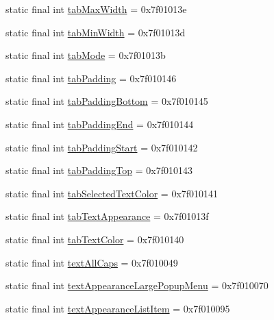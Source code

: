 \begin{CompactItemize}
\item 
static final int \hyperlink{classandroid_1_1support_1_1v7_1_1cardview_1_1_r_1_1attr_62f0af42d2fe75c588e57253235d0551}{tabMaxWidth} = 0x7f01013e
\item 
static final int \hyperlink{classandroid_1_1support_1_1v7_1_1cardview_1_1_r_1_1attr_94555557b32c6757ce9093d84d6eb2c9}{tabMinWidth} = 0x7f01013d
\item 
static final int \hyperlink{classandroid_1_1support_1_1v7_1_1cardview_1_1_r_1_1attr_b55b244d34b62573db40073e19cb5126}{tabMode} = 0x7f01013b
\item 
static final int \hyperlink{classandroid_1_1support_1_1v7_1_1cardview_1_1_r_1_1attr_2e7ad785d084b036d3a2ab86dcac8733}{tabPadding} = 0x7f010146
\item 
static final int \hyperlink{classandroid_1_1support_1_1v7_1_1cardview_1_1_r_1_1attr_1d91fc5b23b7e6327ce3f8cbabbd9699}{tabPaddingBottom} = 0x7f010145
\item 
static final int \hyperlink{classandroid_1_1support_1_1v7_1_1cardview_1_1_r_1_1attr_7ca488e9d7ffd031a7805582f761c4d9}{tabPaddingEnd} = 0x7f010144
\item 
static final int \hyperlink{classandroid_1_1support_1_1v7_1_1cardview_1_1_r_1_1attr_54b83e3a031622ce10b54a318192bcbf}{tabPaddingStart} = 0x7f010142
\item 
static final int \hyperlink{classandroid_1_1support_1_1v7_1_1cardview_1_1_r_1_1attr_21c09bebdf82d16eb1150dfcabd47895}{tabPaddingTop} = 0x7f010143
\item 
static final int \hyperlink{classandroid_1_1support_1_1v7_1_1cardview_1_1_r_1_1attr_a4e8f44a303a59a320f8e72355c7704d}{tabSelectedTextColor} = 0x7f010141
\item 
static final int \hyperlink{classandroid_1_1support_1_1v7_1_1cardview_1_1_r_1_1attr_84a052942353388c579f120da3b4ea0c}{tabTextAppearance} = 0x7f01013f
\item 
static final int \hyperlink{classandroid_1_1support_1_1v7_1_1cardview_1_1_r_1_1attr_1a906a869cf7ac1df0955fe860882e42}{tabTextColor} = 0x7f010140
\item 
static final int \hyperlink{classandroid_1_1support_1_1v7_1_1cardview_1_1_r_1_1attr_3bbc968902d25f099a7cb6590fc8b185}{textAllCaps} = 0x7f010049
\item 
static final int \hyperlink{classandroid_1_1support_1_1v7_1_1cardview_1_1_r_1_1attr_3b335fe9e1e66ac3308d7f590f89e3dd}{textAppearanceLargePopupMenu} = 0x7f010070
\item 
static final int \hyperlink{classandroid_1_1support_1_1v7_1_1cardview_1_1_r_1_1attr_d722356d7f2c26113054f69f2712d3ed}{textAppearanceListItem} = 0x7f010095

\end{CompactItemize}
